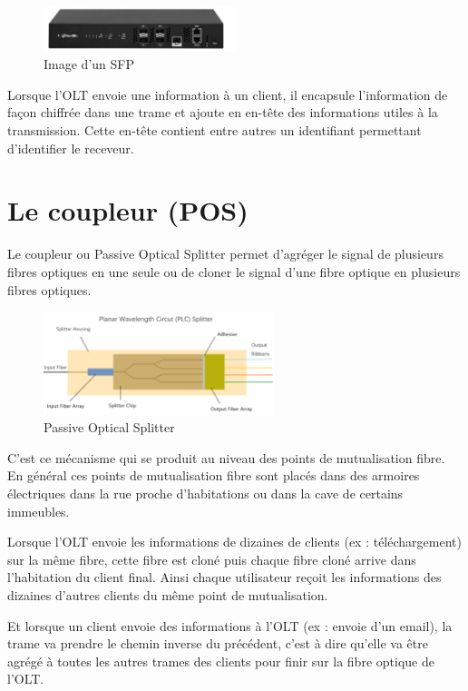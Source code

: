 \documentclass[oneside]{book}
\begin{document}
		\begin{figure}[ht!]
			\centering
			\includegraphics[width=0.5\textwidth]{./object/SFP.png}
			\caption{Image d'un SFP}
		\end{figure}

		Lorsque l’OLT envoie une information à un client, il encapsule l’information de façon chiffrée dans une trame et ajoute en en-tête des informations utiles à la transmission. Cette en-tête contient  entre autres un identifiant permettant d’identifier le receveur.

	\section{Le coupleur (POS)}

		Le coupleur ou Passive Optical Splitter permet d'agréger le signal de plusieurs fibres optiques en une seule ou de cloner le signal d’une fibre optique en plusieurs fibres optiques.
		\begin{figure}[ht!]
			\centering
			\includegraphics[width=0.6\textwidth]{./object/PLO.png}
			\caption{Passive Optical Splitter}
		\end{figure}

		C’est ce mécanisme qui se produit au niveau des points de mutualisation fibre. En général ces points de mutualisation fibre sont placés dans des armoires électriques dans la rue proche d’habitations ou dans la cave de certains immeubles.

		Lorsque l’OLT envoie les informations de dizaines de clients (ex : téléchargement) sur la même fibre, cette fibre est cloné puis chaque fibre cloné arrive dans l’habitation du client final. Ainsi chaque utilisateur reçoit les informations des dizaines d’autres clients du même point de mutualisation.

		Et lorsque un client envoie des informations à l’OLT (ex : envoie d’un email), la trame va prendre le chemin inverse du précédent, c’est à dire qu’elle va être agrégé à toutes les autres trames des clients pour finir sur la fibre optique de l’OLT.
\end{document}
